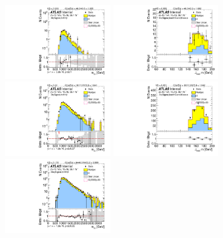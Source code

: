 \begin{figure}[htbp!]
\begin{center}
\includegraphics[width=0.41\textwidth,angle=-90]{figures/boosted/TT/Moriond_TT_FourTag_Signal_mHH_l_1.pdf}
\includegraphics[width=0.41\textwidth,angle=-90]{figures/boosted/TT/Moriond_TT_FourTag_Signal_leadHCand_Mass_s.pdf}\\
\includegraphics[width=0.41\textwidth,angle=-90]{figures/boosted/TT/Moriond_TT_ThreeTag_Signal_mHH_l_1.pdf}
\includegraphics[width=0.41\textwidth,angle=-90]{figures/boosted/TT/Moriond_TT_ThreeTag_Signal_leadHCand_Mass_s.pdf}\\
\includegraphics[width=0.41\textwidth,angle=-90]{figures/boosted/TT/Moriond_TT_TwoTag_split_Signal_mHH_l_1.pdf}

\end{center}
\end{figure}
